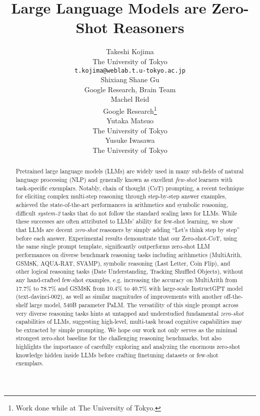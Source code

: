 \documentclass{article}
\title{Large Language Models are Zero-Shot Reasoners}
\author{Takeshi Kojima\\
  The University of Tokyo \\
  \texttt{t.kojima@weblab.t.u-tokyo.ac.jp} \\
\And
  Shixiang Shane Gu
\\
  Google Research, Brain Team \\
\AND
  Machel Reid \\
  Google Research\thanks{Work done while at The University of Tokyo.} \\
\And
  Yutaka Matsuo \\
  The University of Tokyo \\
\And
  Yusuke Iwasawa \\
  The University of Tokyo \\
}
\begin{document}
\maketitle




\begin{abstract}





Pretrained large language models (LLMs) are widely used in many sub-fields of natural language processing (NLP) and generally known as excellent \textit{few-shot} learners with task-specific exemplars. Notably, chain of thought (CoT) prompting, a recent technique for eliciting complex multi-step reasoning through step-by-step answer examples, achieved the state-of-the-art performances in arithmetics and symbolic reasoning, difficult \textit{system-2} tasks that do not follow the standard scaling laws for LLMs. While these successes are often attributed to LLMs' ability for few-shot learning, we show that LLMs are decent \textit{zero-shot} reasoners by simply adding ``Let's think step by step'' before each answer. Experimental results demonstrate that our Zero-shot-CoT, using the same single prompt template, significantly outperforms zero-shot LLM performances on diverse benchmark reasoning tasks including arithmetics (MultiArith, GSM8K, AQUA-RAT, SVAMP), symbolic reasoning (Last Letter, Coin Flip), and other logical reasoning tasks (Date Understanding, Tracking Shuffled Objects),  without any hand-crafted few-shot examples, e.g. increasing the accuracy on MultiArith from 17.7\% to 78.7\% and GSM8K from 10.4\% to 40.7\% with large-scale InstructGPT model (text-davinci-002), as well as similar magnitudes of improvements with another off-the-shelf large model, 540B parameter PaLM. The versatility of this single prompt across very diverse reasoning tasks hints at untapped and understudied fundamental \textit{zero-shot} capabilities of LLMs, suggesting high-level, multi-task broad cognitive capabilities may be extracted by simple prompting. We hope our work not only serves as the minimal strongest zero-shot baseline for the challenging reasoning benchmarks, but also highlights the importance of carefully exploring and analyzing the enormous zero-shot knowledge hidden inside LLMs before crafting finetuning datasets or few-shot exemplars. 






\end{abstract}
\end{document}
